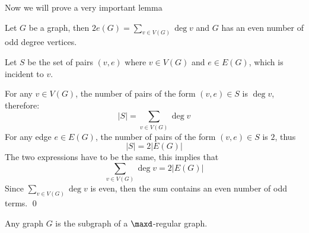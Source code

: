 Now we will prove a very important lemma
\begin{lemma}
    Let $G$ be a graph, then $2e(G) = \sum_{v \in V(G)}\deg{v}$ and $G$ has an even number of odd degree vertices.
\end{lemma}
\begin{prf}
    Let $S$ be the set of pairs $(v, e)$ where $v \in V(G)$ and $e \in E(G)$, which is incident to $v$.

    For any $v \in V(G)$, the number of pairs of the form $(v, e) \in S$ is $\deg{v}$, therefore:
    \begin{equation*}
        |S| = \sum_{v \in V(G)}\deg{v}
    \end{equation*}
    For any edge $e \in E(G)$, the number of pairs of the form $(v, e) \in S$ is $2$, thus
    \begin{equation*}
        |S| = 2|E(G)|
    \end{equation*}
    The two expressions have to be the same, this implies that
    \begin{equation*}
        \sum_{v \in V(G)}\deg{v} = 2|E(G)|
    \end{equation*}
    Since $\sum_{v \in V(G)}\deg{v}$ is even, then the sum contains an even number of odd terms. \qed
\end{prf}
\begin{pipo}
    Any graph $G$ is the subgraph of a $\maxd$-regular graph.
\end{pipo}